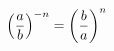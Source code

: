 \documentclass[preview]{standalone}
\begin{document}
\begin{align*}
\special{dvisvgm:raw <g id='unique000'>}\left(\frac{a}{b}\right)^{-n} = \left(\frac{b}{a}\right)^n\special{dvisvgm:raw </g>}
\end{align*}
\end{document}
